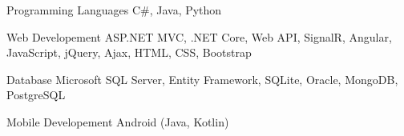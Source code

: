


\begin{cvskills}


\cvskill
{Programming Languages} %
{C\#, Java, Python} %


\cvskill
{Web Developement} %
{ASP.NET MVC, .NET Core, Web API, SignalR, Angular, JavaScript, jQuery, Ajax, HTML, CSS, Bootstrap} %


\cvskill
{Database} %
{Microsoft SQL Server, Entity Framework, SQLite, Oracle, MongoDB, PostgreSQL} %


\cvskill
{Mobile Developement} %
{Android (Java, Kotlin)} %


\end{cvskills}